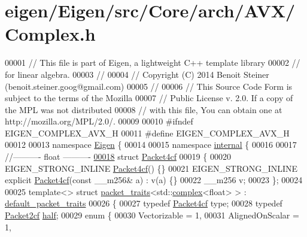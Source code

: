 \hypertarget{eigen_2_eigen_2src_2_core_2arch_2_a_v_x_2_complex_8h_source}{}\section{eigen/\+Eigen/src/\+Core/arch/\+A\+V\+X/\+Complex.h}
\label{eigen_2_eigen_2src_2_core_2arch_2_a_v_x_2_complex_8h_source}

\begin{DoxyCode}
00001 \textcolor{comment}{// This file is part of Eigen, a lightweight C++ template library}
00002 \textcolor{comment}{// for linear algebra.}
00003 \textcolor{comment}{//}
00004 \textcolor{comment}{// Copyright (C) 2014 Benoit Steiner (benoit.steiner.goog@gmail.com)}
00005 \textcolor{comment}{//}
00006 \textcolor{comment}{// This Source Code Form is subject to the terms of the Mozilla}
00007 \textcolor{comment}{// Public License v. 2.0. If a copy of the MPL was not distributed}
00008 \textcolor{comment}{// with this file, You can obtain one at http://mozilla.org/MPL/2.0/.}
00009 
00010 \textcolor{preprocessor}{#ifndef EIGEN\_COMPLEX\_AVX\_H}
00011 \textcolor{preprocessor}{#define EIGEN\_COMPLEX\_AVX\_H}
00012 
00013 \textcolor{keyword}{namespace }\hyperlink{namespace_eigen}{Eigen} \{
00014 
00015 \textcolor{keyword}{namespace }\hyperlink{namespaceinternal}{internal} \{
00016 
00017 \textcolor{comment}{//---------- float ----------}
\hyperlink{struct_eigen_1_1internal_1_1_packet4cf}{00018} \textcolor{keyword}{struct }\hyperlink{struct_eigen_1_1internal_1_1_packet4cf}{Packet4cf}
00019 \{
00020   EIGEN\_STRONG\_INLINE \hyperlink{struct_eigen_1_1internal_1_1_packet4cf}{Packet4cf}() \{\}
00021   EIGEN\_STRONG\_INLINE \textcolor{keyword}{explicit} \hyperlink{struct_eigen_1_1internal_1_1_packet4cf}{Packet4cf}(\textcolor{keyword}{const} \_\_m256& a) : v(a) \{\}
00022   \_\_m256  v;
00023 \};
00024 
00025 \textcolor{keyword}{template}<> \textcolor{keyword}{struct }\hyperlink{struct_eigen_1_1internal_1_1packet__traits}{packet\_traits}<std::\hyperlink{structcomplex}{complex}<float> >  : 
      \hyperlink{struct_eigen_1_1internal_1_1default__packet__traits}{default\_packet\_traits}
00026 \{
00027   \textcolor{keyword}{typedef} \hyperlink{struct_eigen_1_1internal_1_1_packet4cf}{Packet4cf} type;
00028   \textcolor{keyword}{typedef} \hyperlink{struct_eigen_1_1internal_1_1_packet2cf}{Packet2cf} \hyperlink{struct_eigen_1_1half}{half};
00029   \textcolor{keyword}{enum} \{
00030     Vectorizable = 1,
00031     AlignedOnScalar = 1,

\end{DoxyCode}
